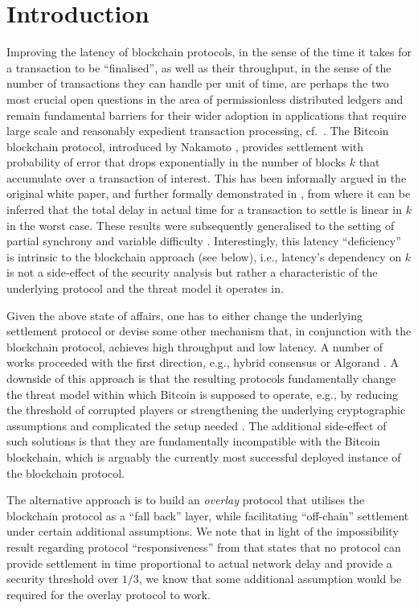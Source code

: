 
\section{Introduction}
\label{sec:intro}

Improving the latency of blockchain protocols, in the sense of the time it takes
for a transaction to be ``finalised'', as well as their throughput, in the sense
of the number of transactions they can handle per unit of time, are perhaps the
two most crucial open questions in the area of permissionless distributed
ledgers and remain fundamental barriers for their wider adoption in applications
that require large scale and reasonably expedient transaction processing,
cf.~\cite{scaling}. The Bitcoin blockchain protocol, introduced by Nakamoto
\cite{bitcoin}, provides settlement with probability of error that drops
exponentially in the number of blocks $k$ that accumulate over a transaction of
interest. This has been informally argued in the original white paper, and
further formally demonstrated in \cite{gkl}, from where it can be inferred that
the total delay in actual time for a transaction to settle is linear in $k$ in
the worst case. These results were subsequently generalised to the setting of
partial synchrony \cite{PSS16} and variable difficulty
\cite{DBLP:conf/crypto/GarayKL17}. Interestingly, this latency ``deficiency'' is
intrinsic to the blockchain approach (see below), i.e., latency's dependency on
$k$ is not a side-effect of the security analysis but rather a characteristic of
the underlying protocol and the threat model it operates in.

Given the above state of affairs, one has to either change the underlying
settlement protocol or devise some other mechanism that, in conjunction with the
blockchain protocol, achieves high throughput and low latency. A number of works
proceeded with the first direction, e.g., hybrid consensus
\cite{DBLP:conf/wdag/PassS17} or Algorand \cite{DBLP:journals/corr/Micali16}. A
downside of this approach is that the resulting protocols fundamentally change
the threat model within which Bitcoin is supposed to operate, e.g., by reducing
the threshold of corrupted players or strengthening the underlying cryptographic
assumptions and complicated the setup needed . The additional
side-effect of such solutions is that they are fundamentally incompatible with
the Bitcoin blockchain, which is arguably the currently most successful deployed
instance of the blockchain protocol.

The alternative approach is to build an {\em overlay} protocol that utilises the
blockchain protocol as a ``fall back'' layer, while facilitating ``off-chain''
settlement under certain additional assumptions. We note that in light of the
impossibility result regarding protocol ``responsiveness'' from
\cite{DBLP:conf/wdag/PassS17} that states that no protocol can provide
settlement in time proportional to actual network delay and provide a security
threshold over $1/3$, we know that some additional assumption would be required
for the overlay protocol to work.

